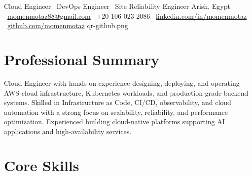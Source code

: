 \documentclass{resume}
\begin{document}
%
  {Cloud Engineer \textbar\ DevOps Engineer \textbar\ Site Reliability Engineer}%
  {Arish, Egypt \textbar\ \href{mailto:momenmotaz88@gmail.com}{momenmotaz88@gmail.com} \textbar\ +20 106 023 2086 \textbar\ \href{https://www.linkedin.com/in/momenmotaz/}{linkedin.com/in/momenmotaz} \textbar\ \href{https://github.com/momenmotaz}{github.com/momenmotaz}}%
  {qr-github.png}

\section{Professional Summary}
Cloud Engineer with hands-on experience designing, deploying, and operating AWS cloud infrastructure, Kubernetes workloads, and production-grade backend systems. Skilled in Infrastructure as Code, CI/CD, observability, and cloud automation with a strong focus on scalability, reliability, and performance optimization. Experienced building cloud-native platforms supporting AI applications and high-availability services.

\section{Core Skills}

\end{document}
